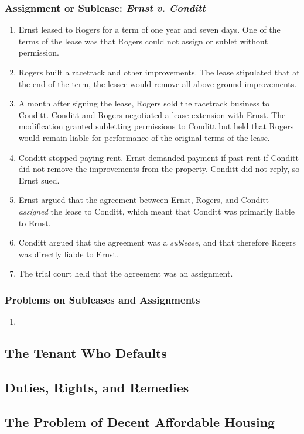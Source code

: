 \subsubsection{Assignment or Sublease: \emph{Ernst v. Conditt}}

\begin{enumerate}
    \item Ernst leased to Rogers for a term of one year and seven days. One of 
    the terms of the lease was that Rogers could not assign or sublet without 
    permission.
    \item Rogers built a racetrack and other improvements. The lease 
    stipulated that at the end of the term, the lessee would remove all 
    above-ground improvements.
    \item A month after signing the lease, Rogers sold the racetrack business 
    to Conditt. Conditt and Rogers negotiated a lease extension with Ernst. 
    The modification granted subletting permissions to Conditt but held that 
    Rogers would remain liable for performance of the original terms of the 
    lease.
    \item Conditt stopped paying rent. Ernst demanded payment if past rent if 
    Conditt did not remove the improvements from the property. Conditt did not 
    reply, so Ernst sued.
    \item Ernst argued that the agreement between Ernst, Rogers, and Conditt 
    \emph{assigned} the lease to Conditt, which meant that Conditt was 
    primarily liable to Ernst.
    \item Conditt argued that the agreement was a \emph{sublease}, and that 
    therefore Rogers was directly liable to Ernst.
    \item The trial court held that the agreement was an assignment.
\end{enumerate}

\subsubsection{Problems on Subleases and Assignments}

\begin{enumerate}
    \item %
\end{enumerate}


\subsection{The Tenant Who Defaults}


\subsection{Duties, Rights, and Remedies}


\subsection{The Problem of Decent Affordable Housing}

